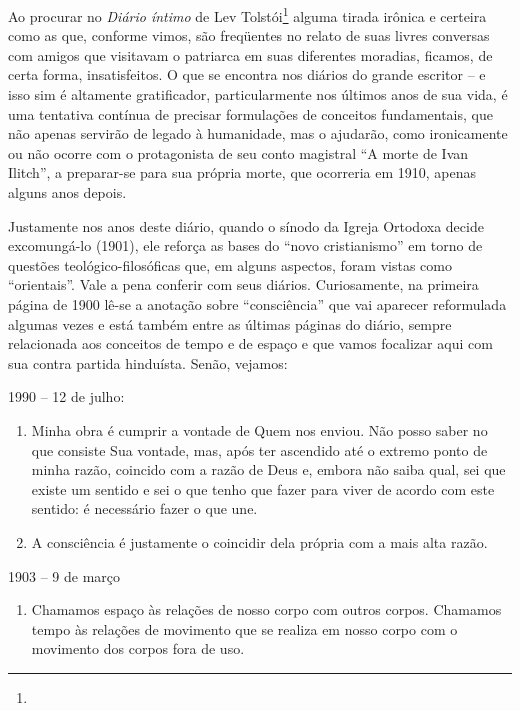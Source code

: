 Ao procurar no \emph{Diário íntimo} de Lev Tolstói\footnote{} alguma
tirada irônica e certeira como as que, conforme vimos, são freqüentes no
relato de suas livres conversas com amigos que visitavam o patriarca em
suas diferentes moradias, ficamos, de certa forma, insatisfeitos. O que
se encontra nos diários do grande escritor -- e isso sim é altamente
gratificador, particularmente nos últimos anos de sua vida, é uma
tentativa contínua de precisar formulações de conceitos fundamentais,
que não apenas servirão de legado à humanidade, mas o ajudarão, como
ironicamente ou não ocorre com o protagonista de seu conto magistral ``A
morte de Ivan Ilitch'', a preparar-se para sua própria morte, que
ocorreria em 1910, apenas alguns anos depois.

Justamente nos anos deste diário, quando o sínodo da Igreja Ortodoxa
decide excomungá-lo (1901), ele reforça as bases do ``novo
cristianismo'' em torno de questões teológico-filosóficas que, em alguns
aspectos, foram vistas como ``orientais''. Vale a pena conferir com seus
diários. Curiosamente, na primeira página de 1900 lê-se a anotação sobre
``consciência'' que vai aparecer reformulada algumas vezes e está também
entre as últimas páginas do diário, sempre relacionada aos conceitos de
tempo e de espaço e que vamos focalizar aqui com sua contra partida
hinduísta. Senão, vejamos:

1990 -- 12 de julho:

\begin{enumerate}
\def\labelenumi{\arabic{enumi})}
\item
  Minha obra é cumprir a vontade de Quem nos enviou. Não posso saber no
  que consiste Sua vontade, mas, após ter ascendido até o extremo ponto
  de minha razão, coincido com a razão de Deus e, embora não saiba qual,
  sei que existe um sentido e sei o que tenho que fazer para viver de
  acordo com este sentido: é necessário fazer o que une.
\item
  A consciência é justamente o coincidir dela própria com a mais alta
  razão.
\end{enumerate}

1903 -- 9 de março

\begin{enumerate}
\def\labelenumi{\arabic{enumi})}
\setcounter{enumi}{2}
\item
  Chamamos espaço às relações de nosso corpo com outros corpos. Chamamos
  tempo às relações de movimento que se realiza em nosso corpo com o
  movimento dos corpos fora de uso.
\end{enumerate}

